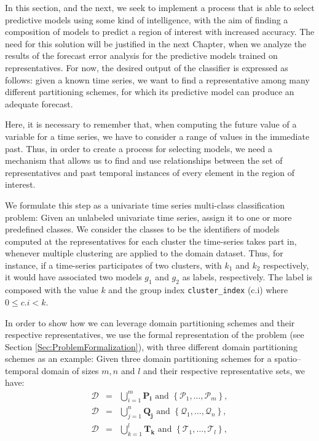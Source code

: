 In this section, and the next, we seek to implement a process that is able to select predictive models using some kind of intelligence, with the aim of finding a composition of models to predict a region of interest with increased accuracy. The need for this solution will be justified in the next Chapter, when we analyze the results of the forecast error analysis for the predictive models trained on representatives. For now, the desired output of the classifier is expressed as follows: given a known time series, we want to find a representative among many different partitioning schemes, for which its predictive model can produce an adequate forecast.

Here, it is  necessary to remember that, when computing the future value of a variable for a time series, we have to consider a range of values in the immediate past\cite{Chatfield2001}. Thus, in order to create a process for selecting models, we need a mechanism that allows us to find and use relationships between the set of representatives and past temporal instances of every element in the region of interest.

We formulate this step as a univariate time series multi-class classification problem: Given an unlabeled univariate time series, assign it to one or more predefined classes. We consider the classes to be the identifiers of models computed at the representatives for each cluster the time-series takes part in, whenever multiple clustering are applied to the domain dataset. Thus, for instance, if a time-series participates of two clusters, with $k_1$ and $k_2$ respectively, it would have associated two models $g_1$ and $g_2$ as labels, respectively.
The label is composed with the value $k$ and the group index \texttt{cluster\_index} (c.i) where $0 \leq c.i <k$. 

In order to show how we can leverage domain partitioning schemes and their respective representatives, we use the formal representation of the problem (see Section \ref{Sec:ProblemFormalization}), with three different domain partitioning schemes as an example: Given three domain partitioning schemes for a spatio--temporal domain of sizes $m, n$ and $l$ and their respective representative sets, we have:
\begin{eqnarray} 
\nonumber
\mathcal{D}	& = & \bigcup_{i=1}^{m} \mathbf{P_i} \,\,\textrm{and} \,\, \left\{\mathcal{P}_{1}, \ldots, \mathcal{P}_{m}\right\},  \\ \nonumber
\mathcal{D} & = & \bigcup_{j=1}^{n} \mathbf{Q_j} \,\,\textrm{and} \,\, \left\{\mathcal{Q}_{1}, \ldots, \mathcal{Q}_{n}\right\}, \\ \nonumber 
\mathcal{D} & = & \bigcup_{k=1}^{l} \mathbf{T_k} \,\,\textrm{and} \,\, \left\{\mathcal{T}_{1}, \ldots, \mathcal{T}_{l}\right\},
\end{eqnarray}

